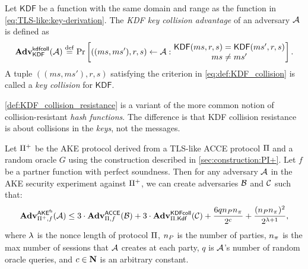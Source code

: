 \begin{definition}\label{def:KDF_collision_resistance}
Let $\mathsf{KDF}$ be a function with the same domain and range as the function in \cref{eq:TLS-like:key-derivation}.
The \emph{KDF key collision advantage} of an adversary $\A$ is defined as
\begin{equation}\label{eq:def:KDF_collision}
	\adv_{\mathsf{KDF}}^{\kdfcoll}(\A) 
		\defeq \Pr \left[ ((ms,ms'), r,s) \gets \A :
				\parbox{13.5em}{\centering
					$\mathsf{KDF}(ms, r,s) = \mathsf{KDF}(ms', r,s)$ \\
					$ms \neq ms'$
				}
			\right] .
\end{equation}
A tuple $((ms,ms'),r,s)$ satisfying the criterion in \eqref{eq:def:KDF_collision} is called a \emph{key collision} for $\mathsf{KDF}$.
\end{definition}

\begin{remark}\label{remark:EAP-TLS:def:KDF_key_collision}
\cref{def:KDF_collision_resistance} is a variant of the more common notion of collision-resistant \emph{hash functions}.
The difference is that KDF collision resistance is about collisions in the \emph{keys},
not the messages. 
\end{remark}





\begin{theorem}\label{thm:AKE_from_TLS-like_ACCE_protocol_main_result}
Let $\protocolderived$ be the AKE protocol derived from a TLS-like ACCE protocol $\protocol$ and a random oracle $G$
using the construction described in \cref{sec:construction:PI+}.
Let $f$ be a partner function with perfect soundness.
Then for any adversary $\A$ in the AKE security experiment against $\protocolderived$,
we can create adversaries $\A[B]$ and $\A[C]$ such that:
\begin{equation}
	\adv_{\protocolderived,f}^{\akefs}(\A)
		\leq 3 \cdot \adv_{\protocol,f}^{\operatorname{\mathsf{ACCE}}}(\A[B])
		+ 3 \cdot \adv_{\protocol.\mathsf{Kdf}}^{\mathsf{KDFcoll}}(\A[C])
		+ \frac{6 \unionbound}{2^{c}}
		+ \frac{(\numparties \numsessions)^2 }{2^{\noncelen+1}},
\end{equation}
where $\noncelen$ is the nonce length of protocol $\protocol$,
$\numparties$ is the number of parties,
$\numsessions$ is the max number of sessions that $\A$ creates at each party,
$q$ is $\A$'s number of random oracle queries,
and $c \in \N$ is an arbitrary constant.
\end{theorem}

